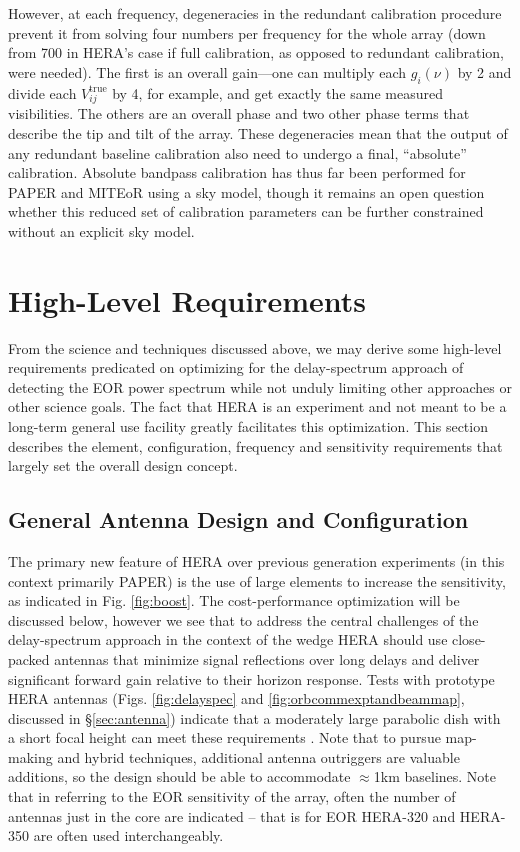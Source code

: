 \documentclass[preprint,11pt]{aastex}
\begin{document}
However, at each frequency, degeneracies in the redundant calibration procedure prevent it from solving four numbers per frequency for the whole array (down from 700 in HERA's case if full calibration, as opposed to redundant calibration, were needed). The first is an overall gain---one can multiply each $g_i(\nu)$ by 2 and divide each $V_{ij}^\text{true}$ by 4, for example, and get exactly the same measured visibilities. The others are an overall phase and two other phase terms that describe the tip and tilt of the array. These degeneracies mean that the output of any redundant baseline calibration also need to undergo a final, ``absolute'' calibration. Absolute bandpass calibration has thus far been performed for PAPER and MITEoR using a sky model, though it remains an open question whether this reduced set of calibration parameters can be further constrained without an explicit sky model.


\section{High-Level Requirements} 
\label{sec:requirements}
From the science and techniques discussed above, we may derive some high-level requirements predicated on optimizing for the delay-spectrum approach of detecting the EOR power spectrum while not unduly limiting other approaches or other science goals.  The fact that HERA is an experiment and not meant to be a long-term general use facility greatly facilitates this optimization. This section describes the element, configuration, frequency and sensitivity requirements that largely set the overall design concept.

\subsection{General Antenna Design and Configuration}
The primary new feature of HERA over previous generation experiments (in this context primarily PAPER) is the use of large elements to increase the sensitivity, as indicated in Fig. \ref{fig:boost}.  The cost-performance optimization will 
be discussed below, however we see that to address the central challenges of the delay-spectrum approach in the context of the wedge
HERA should use close-packed antennas that
minimize signal reflections over long delays and deliver significant forward gain relative to their horizon response.
Tests with prototype HERA antennas (Figs.  \ref{fig:delayspec} and \ref{fig:orbcommexptandbeammap}, discussed in \S\ref{sec:antenna})
indicate that a moderately large parabolic dish with a short focal height can meet these requirements
\citep{ewall-wice_et_al2016-EoXLimits,neben_et_al2016,thyagarajan_et_al2016}.  Note that to pursue map-making and hybrid techniques, additional antenna outriggers are valuable additions, so the design
should be able to accommodate $\approx$1km baselines.  Note that in referring to the EOR sensitivity of the array, often the number of antennas just in the core are
indicated -- that is for EOR HERA-320 and HERA-350 are often used interchangeably.
\end{document}
